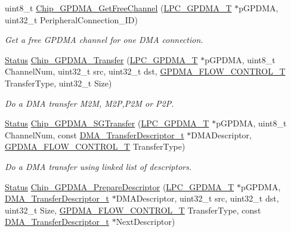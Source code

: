 \begin{DoxyCompactItemize}
uint8\+\_\+t \hyperlink{group___g_p_d_m_a__18_x_x__43_x_x_ga55ff3d61ec382dbec4775bed2db2cde2}{Chip\+\_\+\+G\+P\+D\+M\+A\+\_\+\+Get\+Free\+Channel} (\hyperlink{struct_l_p_c___g_p_d_m_a___t}{L\+P\+C\+\_\+\+G\+P\+D\+M\+A\+\_\+T} $\ast$p\+G\+P\+D\+MA, uint32\+\_\+t Peripheral\+Connection\+\_\+\+ID)
\begin{DoxyCompactList}\small\item\em Get a free G\+P\+D\+MA channel for one D\+MA connection. \end{DoxyCompactList}\item 
\hyperlink{group___l_p_c___types___public___types_ga67a0db04d321a74b7e7fcfd3f1a3f70b}{Status} \hyperlink{group___g_p_d_m_a__18_x_x__43_x_x_ga53a4dbf10ce59c17b0dd2284fa635580}{Chip\+\_\+\+G\+P\+D\+M\+A\+\_\+\+Transfer} (\hyperlink{struct_l_p_c___g_p_d_m_a___t}{L\+P\+C\+\_\+\+G\+P\+D\+M\+A\+\_\+T} $\ast$p\+G\+P\+D\+MA, uint8\+\_\+t Channel\+Num, uint32\+\_\+t src, uint32\+\_\+t dst, \hyperlink{group___g_p_d_m_a__18_x_x__43_x_x_ga2cb59b641cd840f22780c44be1208133}{G\+P\+D\+M\+A\+\_\+\+F\+L\+O\+W\+\_\+\+C\+O\+N\+T\+R\+O\+L\+\_\+T} Transfer\+Type, uint32\+\_\+t Size)
\begin{DoxyCompactList}\small\item\em Do a D\+MA transfer M2M, M2P,P2M or P2P. \end{DoxyCompactList}\item 
\hyperlink{group___l_p_c___types___public___types_ga67a0db04d321a74b7e7fcfd3f1a3f70b}{Status} \hyperlink{group___g_p_d_m_a__18_x_x__43_x_x_ga6a2f7c7238f4288cb73baec79c3e38a7}{Chip\+\_\+\+G\+P\+D\+M\+A\+\_\+\+S\+G\+Transfer} (\hyperlink{struct_l_p_c___g_p_d_m_a___t}{L\+P\+C\+\_\+\+G\+P\+D\+M\+A\+\_\+T} $\ast$p\+G\+P\+D\+MA, uint8\+\_\+t Channel\+Num, const \hyperlink{group___g_p_d_m_a__18_x_x__43_x_x_ga23dbdf610f0d1f61ae30a69944bbee55}{D\+M\+A\+\_\+\+Transfer\+Descriptor\+\_\+t} $\ast$D\+M\+A\+Descriptor, \hyperlink{group___g_p_d_m_a__18_x_x__43_x_x_ga2cb59b641cd840f22780c44be1208133}{G\+P\+D\+M\+A\+\_\+\+F\+L\+O\+W\+\_\+\+C\+O\+N\+T\+R\+O\+L\+\_\+T} Transfer\+Type)
\begin{DoxyCompactList}\small\item\em Do a D\+MA transfer using linked list of descriptors. \end{DoxyCompactList}\item 
\hyperlink{group___l_p_c___types___public___types_ga67a0db04d321a74b7e7fcfd3f1a3f70b}{Status} \hyperlink{group___g_p_d_m_a__18_x_x__43_x_x_ga8605c52de33b7a8977eadaa480f5807c}{Chip\+\_\+\+G\+P\+D\+M\+A\+\_\+\+Prepare\+Descriptor} (\hyperlink{struct_l_p_c___g_p_d_m_a___t}{L\+P\+C\+\_\+\+G\+P\+D\+M\+A\+\_\+T} $\ast$p\+G\+P\+D\+MA, \hyperlink{group___g_p_d_m_a__18_x_x__43_x_x_ga23dbdf610f0d1f61ae30a69944bbee55}{D\+M\+A\+\_\+\+Transfer\+Descriptor\+\_\+t} $\ast$D\+M\+A\+Descriptor, uint32\+\_\+t src, uint32\+\_\+t dst, uint32\+\_\+t Size, \hyperlink{group___g_p_d_m_a__18_x_x__43_x_x_ga2cb59b641cd840f22780c44be1208133}{G\+P\+D\+M\+A\+\_\+\+F\+L\+O\+W\+\_\+\+C\+O\+N\+T\+R\+O\+L\+\_\+T} Transfer\+Type, const \hyperlink{group___g_p_d_m_a__18_x_x__43_x_x_ga23dbdf610f0d1f61ae30a69944bbee55}{D\+M\+A\+\_\+\+Transfer\+Descriptor\+\_\+t} $\ast$Next\+Descriptor)

\end{DoxyCompactItemize}
